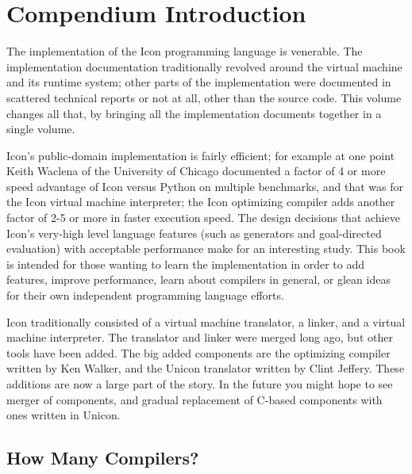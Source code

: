 \clearpage\setcounter{page}{1}\pagestyle{ClintStyleii}

\section{Compendium Introduction}

The implementation of the Icon programming language is venerable.
The implementation documentation traditionally revolved around
the virtual machine and its runtime system; other parts of the
implementation were documented in scattered technical reports or not
at all, other than the source code. This volume changes all that, by
bringing all the implementation documents together in a single volume.

Icon's public-domain implementation is fairly efficient; for example
at one point Keith Waclena of the University of Chicago documented a
factor of 4 or more speed advantage of Icon versus Python on multiple
benchmarks, and that was for the Icon virtual machine interpreter; the
Icon optimizing compiler adds another factor of 2-5 or more in faster
execution speed. The design decisions that achieve Icon's very-high
level language features (such as generators and goal-directed
evaluation) with acceptable performance make for an interesting
study. This book is intended for those wanting to learn the
implementation in order to add features, improve performance, learn
about compilers in general, or glean ideas for their own independent
programming language efforts.

Icon traditionally consisted of a virtual machine translator, a
linker, and a virtual machine interpreter. The translator and linker
were merged long ago, but other tools have been added. The big added
components are the optimizing compiler written by Ken Walker, and the
Unicon translator written by Clint Jeffery. These additions are now a
large part of the story. In the future you might hope to see merger of
components, and gradual replacement of C-based components with ones
written in Unicon.


\subsection*{How Many Compilers?}

